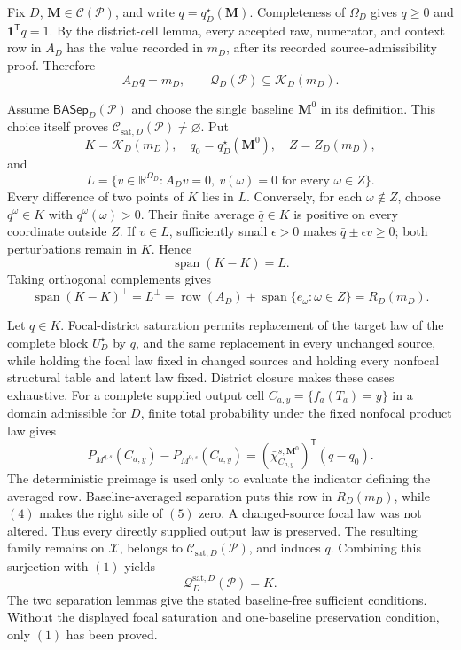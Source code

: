 Fix \(D\), \(\mathbf M\in\mathcal C(\mathcal P)\), and write \(q=q_D^\star(\mathbf M)\).  Completeness of \(\Omega_D\) gives \(q\geq0\) and \(\mathbf 1^{\mathsf T}q=1\).  By the district-cell lemma, every accepted raw, numerator, and context row in \(A_D\) has the value recorded in \(m_D\), after its recorded source-admissibility proof.  Therefore
\[
A_Dq=m_D,
\qquad
\mathcal Q_D(\mathcal P)\subseteq\mathcal K_D(m_D).
\tag{1}
\]

Assume \(\mathsf{BASep}_D(\mathcal P)\) and choose the single baseline \(\mathbf M^0\) in its definition.  This choice itself proves \(\mathcal C_{\mathrm{sat},D}(\mathcal P)\ne\varnothing\).  Put
\[
K=\mathcal K_D(m_D),\quad q_0=q_D^\star(\mathbf M^0),\quad Z=Z_D(m_D),
\]
and
\[
L=\{v\in\mathbb R^{\Omega_D}:A_Dv=0,
\ v(\omega)=0\text{ for every }\omega\in Z\}.
\tag{2}
\]
Every difference of two points of \(K\) lies in \(L\).  Conversely, for each \(\omega\notin Z\), choose \(q^\omega\in K\) with \(q^\omega(\omega)>0\).  Their finite average \(\bar q\in K\) is positive on every coordinate outside \(Z\).  If \(v\in L\), sufficiently small \(\epsilon>0\) makes \(\bar q\pm\epsilon v\geq0\); both perturbations remain in \(K\).  Hence
\[
\operatorname{span}(K-K)=L.
\tag{3}
\]
Taking orthogonal complements gives
\[
\operatorname{span}(K-K)^\perp
=L^\perp
=\operatorname{row}(A_D)+
\operatorname{span}\{e_\omega:\omega\in Z\}
=R_D(m_D).
\tag{4}
\]

Let \(q\in K\).  Focal-district saturation permits replacement of the target law of the complete block \(U_D^\star\) by \(q\), and the same replacement in every unchanged source, while holding the focal law fixed in changed sources and holding every nonfocal structural table and latent law fixed.  District closure makes these cases exhaustive.  For a complete supplied output cell \(C_{a,y}=\{f_a(T_a)=y\}\) in a domain admissible for \(D\), finite total probability under the fixed nonfocal product law gives
\[
P_{M^{q,s}}(C_{a,y})-P_{M^{0,s}}(C_{a,y})
=(\bar\chi_{C_{a,y}}^{s,\mathbf M^0})^{\mathsf T}(q-q_0).
\tag{5}
\]
The deterministic preimage is used only to evaluate the indicator defining the averaged row.  Baseline-averaged separation puts this row in \(R_D(m_D)\), while \((4)\) makes the right side of \((5)\) zero.  A changed-source focal law was not altered.  Thus every directly supplied output law is preserved.  The resulting family remains on \(\mathcal X\), belongs to \(\mathcal C_{\mathrm{sat},D}(\mathcal P)\), and induces \(q\).  Combining this surjection with \((1)\) yields
\[
\mathcal Q_D^{\mathrm{sat},D}(\mathcal P)=K.
\]
The two separation lemmas give the stated baseline-free sufficient conditions.  Without the displayed focal saturation and one-baseline preservation condition, only \((1)\) has been proved.